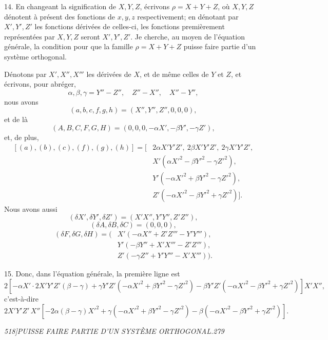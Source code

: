 \documentclass[11pt]{article}
\newcommand{\phead}[3]{\noindent\textit{#1\hfill #2\hfill #3}\par\medskip}
\newcommand{\D}{\delta}
\begin{document}
14. En changeant la signification de $X,Y,Z$, \'ecrivons $\rho=X+Y+Z$, o\`u $X,Y,Z$
d\'enotent \`a pr\'esent des fonctions de $x,y,z$ respectivement; en d\'enotant par
$X',Y',Z'$ les fonctions d\'eriv\'ees de celles-ci, les fonctions premi\`erement repr\'esent\'ees
par $X,Y,Z$ seront $X',Y',Z'$. Je cherche, au moyen de l'\'equation g\'en\'erale, la
condition pour que la famille $\rho=X+Y+Z$ puisse faire partie d'un syst\`eme orthogonal.

D\'enotons par $X',X'',X'''$ les d\'eriv\'ees de $X$, et de m\^eme celles de $Y$ et $Z$, et
\'ecrivons, pour abr\'eger,
\[
\alpha,\beta,\gamma=Y''-Z'',\quad Z''-X'',\quad X''-Y'',
\]
nous avons
\[
(a,b,c,f,g,h)=(X'',Y'',Z'',0,0,0),
\]
et de l\`a
\[
(A,B,C,F,G,H)=(0,0,0,-\alpha X',-\beta Y',-\gamma Z'),
\]
et, de plus,
\[
\begin{split}
[(a),(b),(c),(f),(g),(h)]=[&2\alpha X'Y'Z',\ 2\beta X'Y'Z',\ 2\gamma X'Y'Z',\\
&X'(\alpha X'^2-\beta Y'^2-\gamma Z'^2),\\
&Y'(-\alpha X'^2+\beta Y'^2-\gamma Z'^2),\\
&Z'(-\alpha X'^2-\beta Y'^2+\gamma Z'^2)].
\end{split}
\]
Nous avons aussi
\[
(\D X',\D Y',\D Z')=(X'X'',Y'Y'',Z'Z''),
\]
\[
(\D A,\D B,\D C)=(0,0,0),
\]
\[
\begin{split}
(\D F,\D G,\D H)=(&X'(-\alpha X''+Z'Z'''-Y'Y'''),\\
&Y'(-\beta Y''+X'X'''-Z'Z'''),\\
&Z'(-\gamma Z''+Y'Y'''-X'X''')).
\end{split}
\]

15. Donc, dans l'\'equation g\'en\'erale, la premi\`ere ligne est
\[
2[-\alpha X'\cdot2X'Y'Z'(\beta-\gamma)
+\gamma Y'Z'(-\alpha X'^2+\beta Y'^2-\gamma Z'^2)
-\beta Y'Z'(-\alpha X'^2-\beta Y'^2+\gamma Z'^2)]X'X'',
\]
c'est-\`a-dire
\[
2X'Y'Z'\,X''[-2\alpha(\beta-\gamma)X'^2
+\gamma(-\alpha X'^2+\beta Y'^2-\gamma Z'^2)
-\beta(-\alpha X'^2-\beta Y'^2+\gamma Z'^2)].
\]

\clearpage

\phead{518]}{PUISSE FAIRE PARTIE D'UN SYST\`EME ORTHOGONAL.}{279}
\end{document}
